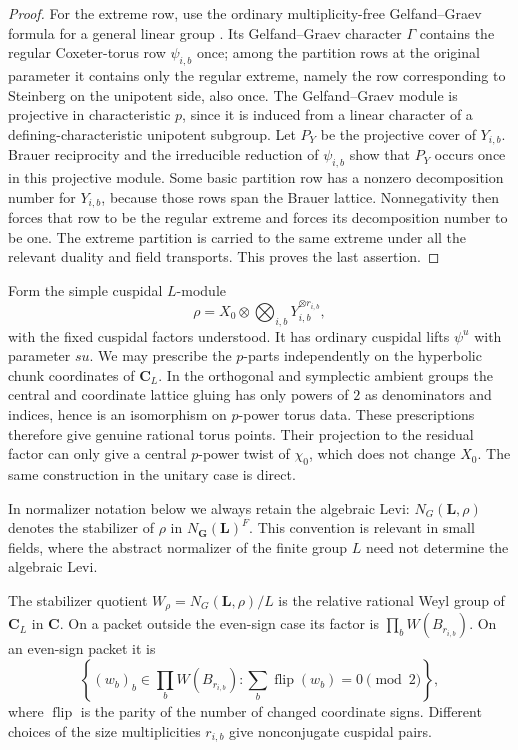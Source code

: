 \begin{proof}
For the extreme row, use the ordinary multiplicity-free
Gelfand--Graev formula for a general linear group
\cite[Theorem~2.5d(ii), (iv), (v)]{BrundanDipperKleshchev}.  Its
Gelfand--Graev character $\Gamma$ contains the regular Coxeter-torus
row $\psi_{i,b}$ once; among the partition rows at the original
parameter it contains only the regular extreme, namely the row
corresponding to Steinberg on the unipotent side, also once.
The Gelfand--Graev module is projective in characteristic $p$, since
it is induced from a linear character of a defining-characteristic
unipotent subgroup.  Let $P_Y$ be the projective cover of $Y_{i,b}$.
Brauer reciprocity and the irreducible reduction of $\psi_{i,b}$
show that $P_Y$ occurs once in this projective module.  Some basic
partition row has a nonzero decomposition number for $Y_{i,b}$,
because those rows span the Brauer lattice.  Nonnegativity then
forces that row to be the regular extreme and forces its
decomposition number to be one.  The extreme partition is carried
to the same extreme under all the relevant duality and field
transports.  This proves the last assertion.
\end{proof}

Form the simple cuspidal $L$-module
\begin{equation}\label{end:rho}
 \rho=X_0\otimes
       \bigotimes_{i,b}Y_{i,b}^{\otimes r_{i,b}},
\end{equation}
with the fixed cuspidal factors understood.  It has ordinary
cuspidal lifts $\psi^u$ with parameter $su$.  We may prescribe the
$p$-parts independently on the hyperbolic chunk coordinates of
$\mathbf C_L$.  In the orthogonal and symplectic ambient groups
the central and coordinate lattice gluing has only powers of $2$
as denominators and indices, hence is an isomorphism on $p$-power
torus data.  These prescriptions therefore give genuine rational
torus points.  Their projection to the residual factor can only
give a central $p$-power twist of $\chi_0$, which does not change
$X_0$.  The same construction in the unitary case is direct.

In normalizer notation below we always retain the algebraic Levi:
$N_G(\mathbf L,\rho)$ denotes the stabilizer of $\rho$ in
$N_{\mathbf G}(\mathbf L)^F$.  This convention is relevant in small
fields, where the abstract normalizer of the finite group $L$ need
not determine the algebraic Levi.

\begin{lemma}[Inertia]\label{end:inertia}
The stabilizer quotient $W_\rho=N_G(\mathbf L,\rho)/L$ is the relative
rational Weyl group of $\mathbf C_L$ in $\mathbf C$.  On a packet
outside the even-sign case its factor is
$\prod_b W(B_{r_{i,b}})$.  On an even-sign packet it is
\begin{equation}\label{end:total-parity}
 \left\{(w_b)_b\in\prod_b W(B_{r_{i,b}}):
          \sum_b \operatorname{flip}(w_b)=0\pmod2\right\},
\end{equation}
where $\operatorname{flip}$ is the parity of the number of changed
coordinate signs.  Different choices of the size multiplicities
$r_{i,b}$ give nonconjugate cuspidal pairs.
\end{lemma}

